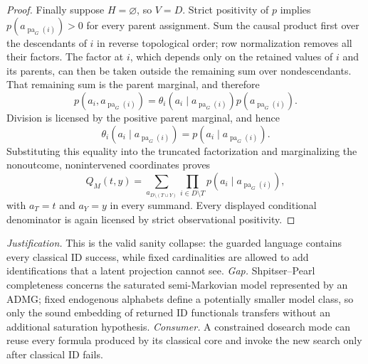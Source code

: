 \documentclass{article}
\begin{document}
\begin{proof}
Finally suppose \(H=\varnothing\), so \(V=D\).  Strict positivity of \(p\) implies \(p(a_{\operatorname{pa}_G(i)})>0\) for every parent assignment.  Sum the causal product first over the descendants of \(i\) in reverse topological order; row normalization removes all their factors.  The factor at \(i\), which depends only on the retained values of \(i\) and its parents, can then be taken outside the remaining sum over nondescendants.  That remaining sum is the parent marginal, and therefore
\[
 p(a_i,a_{\operatorname{pa}_G(i)})
 =\theta_i(a_i\mid a_{\operatorname{pa}_G(i)})
  p(a_{\operatorname{pa}_G(i)}).
\]
Division is licensed by the positive parent marginal, and hence
\[
 \theta_i(a_i\mid a_{\operatorname{pa}_G(i)})
 =p(a_i\mid a_{\operatorname{pa}_G(i)}).
\]
Substituting this equality into the truncated factorization and marginalizing the nonoutcome, nonintervened coordinates proves
\[
 Q_M(t,y)
 =\sum_{a_{D\setminus(T\cup Y)}}
   \prod_{i\in D\setminus T}
   p(a_i\mid a_{\operatorname{pa}_G(i)}),
\]
with \(a_T=t\) and \(a_Y=y\) in every summand.  Every displayed conditional denominator is again licensed by strict observational positivity.
\end{proof}
\par\smallskip\noindent \textit{Justification.} This is the valid sanity collapse: the guarded language contains every classical ID success, while fixed cardinalities are allowed to add identifications that a latent projection cannot see. \textit{Gap.} Shpitser--Pearl completeness concerns the saturated semi-Markovian model represented by an ADMG; fixed endogenous alphabets define a potentially smaller model class, so only the sound embedding of returned ID functionals transfers without an additional saturation hypothesis. \textit{Consumer.} A constrained dosearch mode can reuse every formula produced by its classical core and invoke the new search only after classical ID fails.
\end{document}
